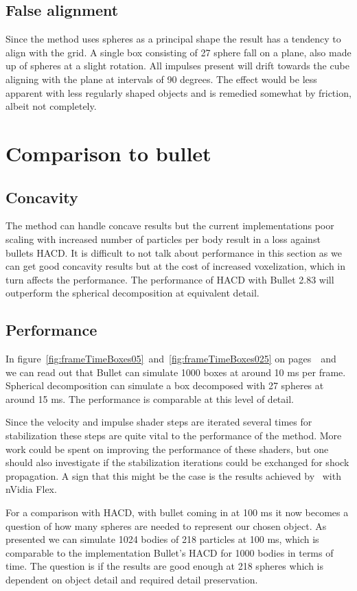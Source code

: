 \subsection{False alignment}
Since the method uses spheres as a principal shape the result has a tendency to align
with the grid. A single box consisting of 27 sphere fall on a plane, also made up of spheres
at a slight rotation. All impulses present will drift towards the cube aligning with the
plane at intervals of 90 degrees. The effect would be less apparent with less regularly shaped objects and
is remedied somewhat by friction, albeit not completely.

\section{Comparison to bullet}
\subsection{Concavity}
The method can handle concave results but the current implementations poor scaling
with increased number of particles per body result in a loss against bullets HACD.
It is difficult to not talk about performance in this section as we can get good
concavity results but at the cost of increased voxelization, which in turn affects the
performance.
The performance of HACD with Bullet 2.83 will outperform the spherical decomposition
at equivalent detail.
\subsection{Performance}
In figure~\ref{fig:frameTimeBoxes05}~and~\ref{fig:frameTimeBoxes025}
on pages~\pageref{fig:frameTimeBoxes05}~and~\pageref{fig:frameTimeBoxes025}
we can read out that Bullet can simulate 1000 boxes at around 10 ms per frame.
Spherical decomposition can simulate a box decomposed with 27 spheres at around 15 ms.
The performance is comparable at this level of detail.

Since the velocity and impulse shader steps are iterated
several times for stabilization these steps are quite vital to the performance
of the method. More work could be spent on improving the performance of these shaders,
but one should also investigate if the stabilization iterations could be exchanged for
shock propagation. A sign that this might be the case is the results achieved by~\cite{flex} with nVidia Flex.

For a comparison with HACD, with bullet coming in at 100 ms it now becomes
a question of how many spheres are needed to represent our chosen object.
As presented we can simulate 1024 bodies of 218 particles at 100 ms, which is comparable to
 the implementation Bullet's HACD for 1000 bodies in terms of time. The question is
 if the results are good enough at 218 spheres which is dependent on object detail
 and required detail preservation.

